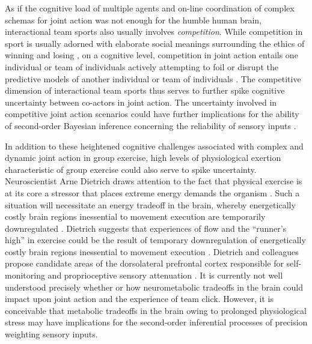 \begin{CJK}{UTF8}{gbsn}
As if the cognitive load of multiple agents and on-line coordination of complex schemas for joint action was not enough for the humble human brain, interactional team sports also usually involves \textit{competition}.  While competition in sport is usually adorned with elaborate social meanings surrounding the ethics of winning and losing \citep{McNamee2008}, on a cognitive level, competition in joint action entails one individual or team of individuals actively attempting to foil or disrupt the predictive models of another individual or team of individuals \citep{Reimer2006}.  The competitive dimension of interactional team sports thus serves to further spike cognitive uncertainty between co-actors in joint action.  The uncertainty involved in competitive joint action scenarios could have further implications for the ability of second-order Bayesian inference concerning the reliability of sensory inputs \citep{Pezzulo2014}.

In addition to these heightened cognitive challenges associated with complex and dynamic joint action in group exercise, high levels of physiological exertion characteristic of group exercise could also serve to spike uncertainty.  Neuroscientist Arne Dietrich draws attention to the fact that physical exercise is at its core a stressor that places extreme energy demands the organism \citep{Dietrich2011}.
Such a situation will necessitate an energy tradeoff in the brain, whereby energetically costly brain regions inessential to movement execution are temporarily downregulated \citep{Dietrich2004b}.  Dietrich suggests that experiences of flow and the ``runner's high'' in exercise could be the result of temporary downregulation of energetically costly brain regions inessential to movement execution  \citep{Dietrich2004b}.  Dietrich and colleagues propose candidate areas of the dorsolateral prefrontal cortex responsible for self-monitoring and proprioceptive sensory attenuation \citep[commonly known as the ``inner critic'' regions of the brain, see][]{Limb2008}.  It is currently not well understood precisely whether or how neurometabolic tradeoffs in the brain could impact upon joint action and the experience of team click.  However, it is conceivable that metabolic tradeoffs in the brain owing to prolonged physiological stress may have implications for the second-order inferential processes of precision weighting sensory inputs.



\end{CJK}
